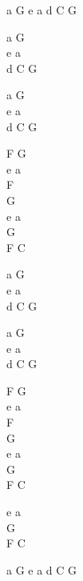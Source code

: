 \begin{chordw}
    a G e a d C G

    a G\\
    e a\\
    d C G

    a G\\
    e a\\
    d C G

    F G\\
    e a\\
    F\\
    G\\
    e a\\
    G\\
    F C

    a G\\
    e a\\
    d C G

    a G\\
    e a\\
    d C G

    F G\\
    e a\\
    F\\
    G\\
    e a\\
    G\\
    F C
    
    e a\\
    G\\
    F C

    a G e a d C G
\end{chordw}
